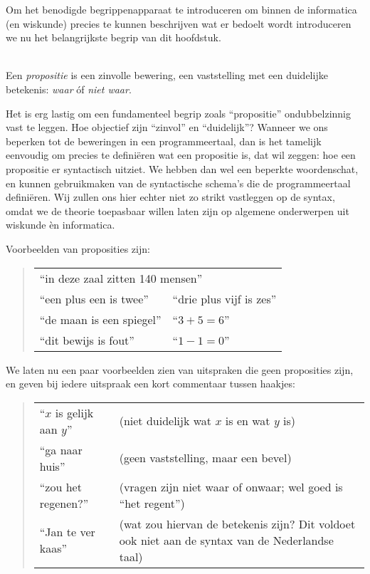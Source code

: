 Om het benodigde begrippenapparaat te introduceren om binnen de informatica (en wiskunde) precies te kunnen beschrijven wat er bedoelt wordt introduceren we nu het belangrijkste begrip van dit hoofdstuk.
\begin{definition}[Propositie]\label{def:prop}\mbox{}\\
Een \textit{propositie} is een zinvolle bewering, een vaststelling met een duidelijke betekenis: \textit{waar} \'of \textit{niet waar}.
\end{definition}

Het is erg lastig om een fundamenteel begrip zoals \enquote{propositie} ondubbelzinnig vast te leggen. Hoe objectief zijn \enquote{zinvol} en \enquote{duidelijk}? Wanneer we ons beperken tot de beweringen in een programmeertaal, dan is het tamelijk eenvoudig om precies te defini\"eren wat een propositie is, dat wil zeggen: hoe een propositie er syntactisch uitziet. We hebben dan wel een beperkte woordenschat, en kunnen gebruikmaken van de syntactische schema's die de programmeertaal defini\"eren. Wij zullen ons hier echter niet zo strikt vastleggen op de syntax, omdat we de theorie toepasbaar willen laten zijn op algemene onderwerpen uit wiskunde \`en informatica.

Voorbeelden van proposities zijn:
\begin{quote}
\begin{tabular}{p{}p{}}
\multicolumn{2}{l}{\enquote{in deze zaal zitten 140 mensen}}\\
\enquote{een plus een is twee}&\enquote{drie plus vijf is zes}\\
\enquote{de maan is een spiegel}&\enquote{$3+5=6$}\\
\enquote{dit bewijs is fout}&\enquote{$1-1=0$}
\end{tabular}
\end{quote}

We laten nu een paar voorbeelden zien van uitspraken die geen proposities zijn, en geven bij iedere uitspraak een kort commentaar tussen haakjes:
\begin{quote}
\begin{tabular}{p{}p{}}
\enquote{$x$ is gelijk aan $y$}&(niet duidelijk wat $x$ is en wat $y$ is)\\
\enquote{ga naar huis}&(geen vaststelling, maar een bevel)\\
\enquote{zou het regenen?}&(vragen zijn niet waar of onwaar; wel goed is \enquote{het regent})\\
\enquote{Jan te ver kaas}&(wat zou hiervan de betekenis zijn? Dit voldoet ook niet aan de syntax van de Nederlandse taal)
\end{tabular}
\end{quote}

